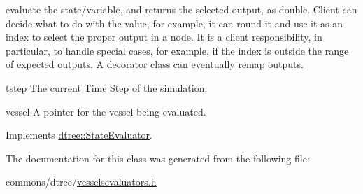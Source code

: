 evaluate the state/variable, and returns the selected output, as double. Client can decide what to do with the value, for example, it can round it and use it as an index to select the proper output in a node. It is a client responsibility, in particular, to handle special cases, for example, if the index is outside the range of expected outputs. A decorator class can eventually remap outputs. 

\begin{DoxyItemize}
\item tstep The current Time Step of the simulation. \item vessel A pointer for the vessel being evaluated. \end{DoxyItemize}


Implements \mbox{\hyperlink{classdtree_1_1_state_evaluator_ab57666219fbdc728f40d9d5acd5726cb}{dtree\+::\+State\+Evaluator}}.



The documentation for this class was generated from the following file\+:\begin{DoxyCompactItemize}
\item 
commons/dtree/\mbox{\hyperlink{vesselsevaluators_8h}{vesselsevaluators.\+h}}\end{DoxyCompactItemize}
